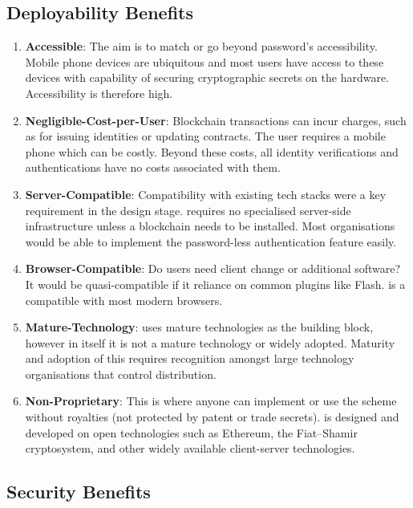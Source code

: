 \subsection{Deployability Benefits}

\begin{enumerate}
    \item \textbf{Accessible}: The aim is to match or go beyond password's accessibility. Mobile phone devices are ubiquitous and most users have access to these devices with capability of securing cryptographic secrets on the hardware.  Accessibility is therefore high.

    \item \textbf{Negligible-Cost-per-User}: Blockchain transactions can incur charges, such as for issuing identities or updating contracts. The user requires a mobile phone which can be costly. Beyond these costs, all identity verifications and authentications have no costs associated with them.

    \item \textbf{Server-Compatible}: Compatibility with existing tech stacks were a key requirement in the design stage. \deeid requires no specialised server-side infrastructure unless a blockchain needs to be installed. Most organisations would be able to implement the password-less authentication feature easily. 

    \item \textbf{Browser-Compatible}: Do users need client change or additional software? It would be quasi-compatible if it reliance on common plugins like Flash. \deeid is a compatible with most modern browsers.

    \item \textbf{Mature-Technology}: \deeid uses mature technologies as the building block, however in itself it is not a mature technology or widely adopted. Maturity and adoption of this \deeid requires recognition amongst large technology organisations that control distribution.

    \item \textbf{Non-Proprietary}: This is where anyone can implement or use the scheme without royalties (not protected by patent or trade secrets). \deeid is designed and developed on open technologies such as Ethereum, the Fiat--Shamir cryptosystem, and other widely available client-server technologies.
\end{enumerate}


\subsection{Security Benefits}

